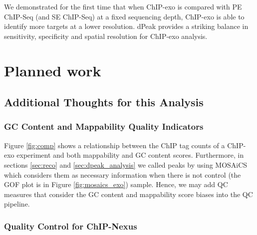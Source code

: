 \documentclass[11pt]{article}\usepackage[]{graphicx}\usepackage[]{color}
\begin{document}
We demonstrated for the first time that when ChIP-exo is compared with
PE ChIP-Seq (and SE ChIP-Seq) at a fixed sequencing depth, ChIP-exo is
able to identify more targets at a lower resolution. dPeak provides a
striking balance in sensitivity, specificity and spatial resolution
for ChIP-exo analysis.




\newpage


\section{Planned work}
\label{sec:future}

\subsection{Additional Thoughts for this Analysis}

\subsubsection{GC Content and Mappability Quality Indicators}
\label{sec:gc_map_qc}

Figure \ref{fig:comp} shows a relationship between the ChIP tag counts
of a ChIP-exo experiment and both mappability and GC content
scores. Furthermore, in sections \ref{sec:reco} and
\ref{sec:dpeak_analysis} we called peaks by using MOSAiCS which
considers them as necessary information when there is not control (the
GOF plot is in Figure \ref{fig:mosaics_exo}) sample. Hence, we may add
QC measures that consider the GC content and mappability score biases
into the QC pipeline.

\subsubsection{Quality Control for ChIP-Nexus}
\label{sec:nexus}

\end{document}
